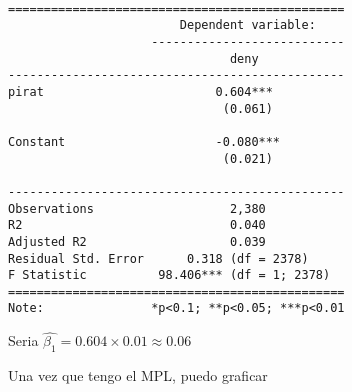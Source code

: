 \documentclass[
  letterpaper,
  DIV=11,
  numbers=noendperiod]{scrreprt}
\begin{document}
\begin{verbatim}

===============================================
                        Dependent variable:    
                    ---------------------------
                               deny            
-----------------------------------------------
pirat                        0.604***          
                              (0.061)          
                                               
Constant                     -0.080***         
                              (0.021)          
                                               
-----------------------------------------------
Observations                   2,380           
R2                             0.040           
Adjusted R2                    0.039           
Residual Std. Error      0.318 (df = 2378)     
F Statistic          98.406*** (df = 1; 2378)  
===============================================
Note:               *p<0.1; **p<0.05; ***p<0.01
\end{verbatim}

Seria \(\widehat{\beta_1}=0.604\times0.01\approx 0.06\)

Una vez que tengo el MPL, puedo graficar
\end{document}
